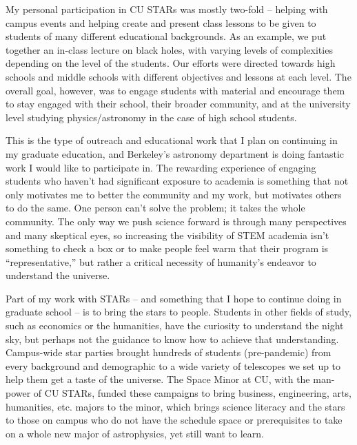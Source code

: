\documentclass[11pt,letterpaper]{article}
\begin{document}
My personal participation in CU STARs was mostly two-fold -- helping with campus events and helping create and present class lessons to be given to students of many different educational backgrounds. As an example, we put together an in-class lecture on black holes, with varying levels of complexities depending on the level of the students. Our efforts were directed towards high schools and middle schools with different objectives and lessons at each level. The overall goal, however, was to engage students with material and encourage them to stay engaged with their school, their broader community, and at the university level studying physics/astronomy in the case of high school students.

This is the type of outreach and educational work that I plan on continuing in my graduate education, and  Berkeley's astronomy department is doing fantastic work I would like to participate in. The rewarding experience of engaging students who haven’t had significant exposure to academia is something that not only motivates me to better the community and my work, but motivates others to do the same. One person can't solve the problem; it takes the whole community. The only way we push science forward is through many perspectives and many skeptical eyes, so increasing the visibility of STEM academia isn’t something to check a box or to make people feel warm that their program is “representative,” but rather a critical necessity of humanity’s endeavor to understand the universe. 

\pagebreak

Part of my work with STARs -- and something that I hope to continue doing in graduate school -- is to bring the stars to people. Students in other fields of study, such as economics or the humanities, have the curiosity to understand the night sky, but perhaps not the guidance to know how to achieve that understanding. Campus-wide star parties brought hundreds of students (pre-pandemic) from every background and demographic to a wide variety of telescopes we set up to help them get a taste of the universe. The Space Minor at CU, with the man-power of CU STARs, funded these campaigns to bring business, engineering, arts, humanities, etc. majors to the minor, which brings science literacy and the stars to those on campus who do not have the schedule space or prerequisites to take on a whole new major of astrophysics, yet still want to learn.
\end{document}

